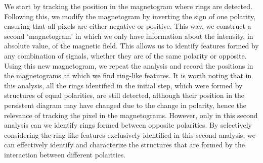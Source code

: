 \documentclass[12pt]{mythesis}
\begin{document}
We start by tracking the position in the magnetogram where rings are detected. Following this, we modify the magnetogram by inverting the sign of one polarity, ensuring that all pixels are either negative or positive. This way, we construct a second `magnetogram' in which we only have information about the intensity, in absolute value, of the magnetic field. This allows us to identify features formed by any combination of signals, whether they are of the same polarity or opposite. Using this new magnetogram, we repeat the analysis and record the positions in the magnetograms at which we find ring-like features. It is worth noting that in this analysis, all the rings identified in the initial step, which were formed by structures of equal polarities, are still detected, although their position in the persistent diagram may have changed due to the change in polarity, hence the relevance of tracking the pixel in the magnetograms. However, only in this second analysis can we identify rings formed between opposite polarities. By selectively considering the ring-like features exclusively identified in this second analysis, we can effectively identify and characterize the structures that are formed by the interaction between different polarities. 
\end{document}
